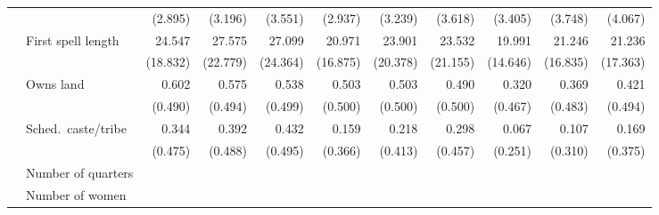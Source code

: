 \begin{table}
\begin{center}
\begin{scriptsize}
\begin{threeparttable}
\begin{tabular} {@{} c l D{.}{.}{1.3} D{.}{.}{1.3} D{.}{.}{1.3} D{.}{.}{1.3} D{.}{.}{1.3} D{.}{.}{1.3} D{.}{.}{1.3} D{.}{.}{1.3} D{.}{.}{1.3} @{}}
                    &                     &     (2.895)         &     (3.196)         &     (3.551)         &     (2.937)         &     (3.239)         &     (3.618)         &     (3.405)         &     (3.748)         &     (4.067)         \\
                    & First spell length  &      24.547         &      27.575         &      27.099         &      20.971         &      23.901         &      23.532         &      19.991         &      21.246         &      21.236         \\
                    &                     &    (18.832)         &    (22.779)         &    (24.364)         &    (16.875)         &    (20.378)         &    (21.155)         &    (14.646)         &    (16.835)         &    (17.363)         \\
                    & Owns land           &       0.602         &       0.575         &       0.538         &       0.503         &       0.503         &       0.490         &       0.320         &       0.369         &       0.421         \\
                    &                     &     (0.490)         &     (0.494)         &     (0.499)         &     (0.500)         &     (0.500)         &     (0.500)         &     (0.467)         &     (0.483)         &     (0.494)         \\
                    & Sched.\ caste/tribe &       0.344         &       0.392         &       0.432         &       0.159         &       0.218         &       0.298         &       0.067         &       0.107         &       0.169         \\
                    &                     &     (0.475)         &     (0.488)         &     (0.495)         &     (0.366)         &     (0.413)         &     (0.457)         &     (0.251)         &     (0.310)         &     (0.375)         \\
                    & Number of quarters  &  &  &  &  &  &  &  &  &  \\
                    & Number of women     &  &  &  &  &  &  &  &  &  \\

\end{tabular}
\end{threeparttable}
\end{scriptsize}
\end{center}
\end{table}
